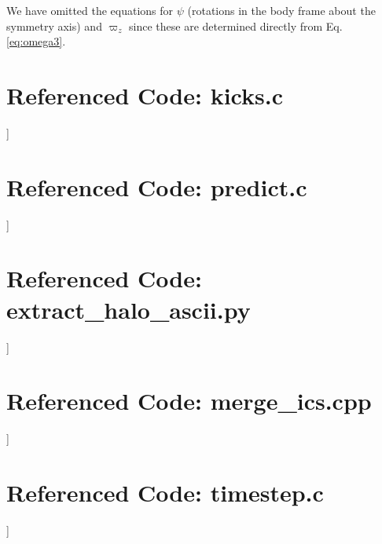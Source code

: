\noindent We have omitted the equations for $\psi$ (rotations in the body frame about the symmetry axis) and $\varpi_z$ since these are determined directly from Eq.\,\ref{eq:omega3}.   

\chapter{Referenced Code: kicks.c} \label{ch:kicks.c}
]

\chapter{Referenced Code: predict.c} \label{ch:predict.c}
]


\chapter{Referenced Code: extract\_halo\_ascii.py} \label{ch:extract_halo_ascii.py}
]
    
    
\chapter{Referenced Code: merge\_ics.cpp} \label{ch:merge_ics.cpp}
]
    
\chapter{Referenced Code: timestep.c} \label{ch:timestep.c}
]
